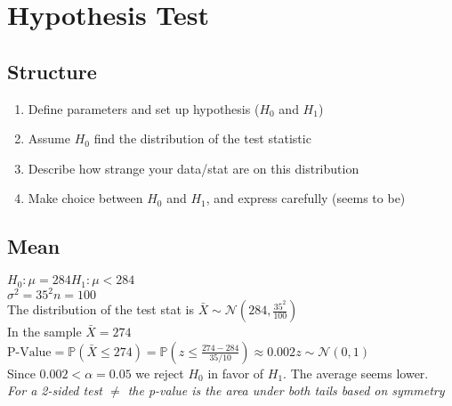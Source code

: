 \documentclass{article}
\begin{document}
\section{Hypothesis Test}
\label{sec:hypothesis}
\subsection{Structure}
\label{sec:hstructure}
\begin{enumerate}
    \item Define parameters and set up hypothesis ($H_0$ and $H_1$)
    \item Assume $H_0$ find the distribution of the test statistic
    \item Describe how strange your data/stat are on this distribution
    \item Make choice between $H_0$ and $H_1$, and express carefully (seems to be)
\end{enumerate}
\subsection{Mean}
\label{sec:hmean}
$H_0:\mu=284$\hspace*{0.5in}$H_1:\mu<284$\\
$\sigma^2=35^2$\hspace*{0.5in}$n=100$\\
The distribution of the test stat is $\bar X\sim\mathcal{N}(284,\frac{35^2}{100})$\\
In the sample $\bar X=274$\\
$\text{P-Value}=\mathbb{P}(\bar X\leq 274)=\mathbb{P}(z\leq\frac{274-284}{35/10})\approx0.002$\hspace*{0.25in}$z\sim\mathcal{N}(0,1)$\\
Since $0.002<\alpha=0.05$ we reject $H_0$ in favor of $H_1$. The average seems lower.\\
\textit{For a 2-sided test $\neq$ the p-value is the area under both tails based on symmetry}
\end{document}
